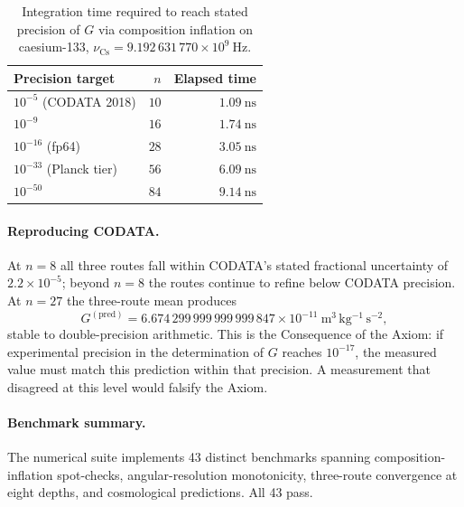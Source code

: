 \documentclass[11pt,twocolumn,a4paper]{article}
\theoremstyle{axiomstyle}
\theoremstyle{conseqstyle}
\theoremstyle{definition}
\theoremstyle{remark}
\begin{document}
\begin{table}[H]
\centering\small
\caption{Integration time required to reach stated precision of $G$ via composition inflation on caesium-133, $\nu_{\mathrm{Cs}}=9.192\,631\,770\times10^{9}~\mathrm{Hz}$.}
\label{tab:integrationtime}
\begin{tabular}{lrr}
\toprule
Precision target & $n$ & Elapsed time\\
\midrule
$10^{-5}$ (CODATA 2018)  & $10$ & $1.09~\mathrm{ns}$\\
$10^{-9}$                & $16$ & $1.74~\mathrm{ns}$\\
$10^{-16}$ (fp64)        & $28$ & $3.05~\mathrm{ns}$\\
$10^{-33}$ (Planck tier) & $56$ & $6.09~\mathrm{ns}$\\
$10^{-50}$               & $84$ & $9.14~\mathrm{ns}$\\
\bottomrule
\end{tabular}
\end{table}

\paragraph{Reproducing CODATA.} At $n=8$ all three routes fall within CODATA's stated fractional uncertainty of $2.2\times10^{-5}$; beyond $n=8$ the routes continue to refine below CODATA precision. At $n=27$ the three-route mean produces
\begin{equation}
G^{(\mathrm{pred})}=6.674\,299\,999\,999\,999\,847\times10^{-11}~\mathrm{m^{3}\,kg^{-1}\,s^{-2}},
\end{equation}
stable to double-precision arithmetic. This is the Consequence of the Axiom: if experimental precision in the determination of $G$ reaches $10^{-17}$, the measured value must match this prediction within that precision. A measurement that disagreed at this level would falsify the Axiom.

\paragraph{Benchmark summary.} The numerical suite implements 43 distinct benchmarks spanning composition-inflation spot-checks, angular-resolution monotonicity, three-route convergence at eight depths, and cosmological predictions. All 43 pass.
\end{document}
